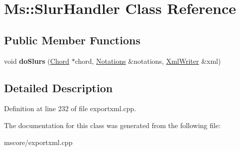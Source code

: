 \hypertarget{class_ms_1_1_slur_handler}{}\section{Ms\+:\+:Slur\+Handler Class Reference}
\label{class_ms_1_1_slur_handler}
\subsection*{Public Member Functions}
\begin{DoxyCompactItemize}
\item 
\mbox{\label{class_ms_1_1_slur_handler_add0c9a5962cb7d45760c02d71e9597a4}} 
void {\bfseries do\+Slurs} (\hyperlink{class_ms_1_1_chord}{Chord} $\ast$chord, \hyperlink{class_ms_1_1_notations}{Notations} \&notations, \hyperlink{class_ms_1_1_xml_writer}{Xml\+Writer} \&xml)
\end{DoxyCompactItemize}


\subsection{Detailed Description}


Definition at line 232 of file exportxml.\+cpp.



The documentation for this class was generated from the following file\+:\begin{DoxyCompactItemize}
\item 
mscore/exportxml.\+cpp\end{DoxyCompactItemize}
